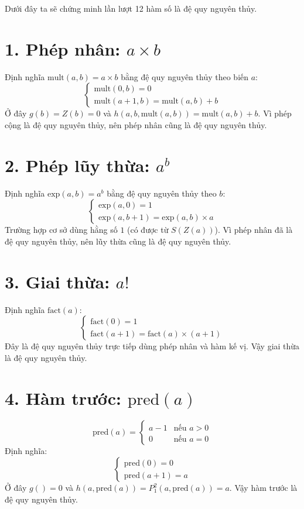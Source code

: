 \documentclass[12pt,a4paper]{article}
\begin{document}
Dưới đây ta sẽ chứng minh lần lượt 12 hàm số là đệ quy nguyên thủy.

\section*{1. Phép nhân: $a \times b$}

Định nghĩa $\mathrm{mult}(a, b) = a \times b$ bằng đệ quy nguyên thủy theo biến $a$:
\[
\begin{cases}
\mathrm{mult}(0, b) = 0 \\
\mathrm{mult}(a+1, b) = \mathrm{mult}(a, b) + b
\end{cases}
\]
Ở đây $g(b) = Z(b) = 0$ và $h(a, b, \mathrm{mult}(a,b)) = \mathrm{mult}(a,b) + b$. Vì phép cộng là đệ quy nguyên thủy, nên phép nhân cũng là đệ quy nguyên thủy.

\section*{2. Phép lũy thừa: $a^b$}

Định nghĩa $\mathrm{exp}(a, b) = a^b$ bằng đệ quy nguyên thủy theo $b$:
\[
\begin{cases}
\mathrm{exp}(a, 0) = 1 \\
\mathrm{exp}(a, b+1) = \mathrm{exp}(a, b) \times a
\end{cases}
\]
Trường hợp cơ sở dùng hằng số $1$ (có được từ $S(Z(a))$). Vì phép nhân đã là đệ quy nguyên thủy, nên lũy thừa cũng là đệ quy nguyên thủy.

\section*{3. Giai thừa: $a!$}

Định nghĩa $\mathrm{fact}(a)$:
\[
\begin{cases}
\mathrm{fact}(0) = 1 \\
\mathrm{fact}(a+1) = \mathrm{fact}(a) \times (a+1)
\end{cases}
\]
Đây là đệ quy nguyên thủy trực tiếp dùng phép nhân và hàm kế vị. Vậy giai thừa là đệ quy nguyên thủy.

\section*{4. Hàm trước: $\mathrm{pred}(a)$}

\[
\mathrm{pred}(a) = 
\begin{cases}
a-1 & \text{nếu } a > 0 \\
0 & \text{nếu } a = 0
\end{cases}
\]
Định nghĩa:
\[
\begin{cases}
\mathrm{pred}(0) = 0 \\
\mathrm{pred}(a+1) = a
\end{cases}
\]
Ở đây $g() = 0$ và $h(a, \mathrm{pred}(a)) = P_1^2(a, \mathrm{pred}(a)) = a$. Vậy hàm trước là đệ quy nguyên thủy.
\end{document}
